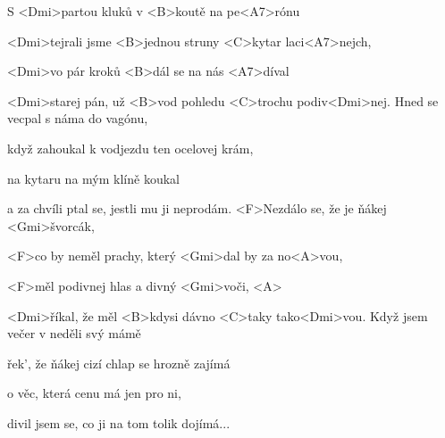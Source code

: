 

\zs
S <Dmi>partou kluků v <B>koutě na pe<A7>rónu

<Dmi>tejrali jsme <B>jednou struny <C>kytar laci<A7>nejch,

<Dmi>vo pár kroků <B>dál se na nás <A7>díval

<Dmi>starej pán, už <B>vod pohledu <C>trochu 
podiv<Dmi>nej.
\ks
\zs
Hned se vecpal s náma do vagónu,

když zahoukal k vodjezdu ten ocelovej krám,

na kytaru na mým klíně koukal

a za chvíli ptal se, jestli mu ji neprodám.
\ks
\zr
<F>Nezdálo se, že je ňákej <Gmi>švorcák,

<F>co by neměl prachy, který <Gmi>dal by za no<A>vou,

<F>měl podivnej hlas a divný <Gmi>voči, <A>

<Dmi>říkal, že měl <B>kdysi dávno <C>taky tako<Dmi>vou.
\kr
\zs
{}
\ks
\zr \kr
\zs
Když jsem večer v neděli svý mámě

řek', že ňákej cizí chlap se hrozně zajímá

o věc, která cenu má jen pro ni,

divil jsem se, co ji na tom tolik dojímá...
\ks
\kp
